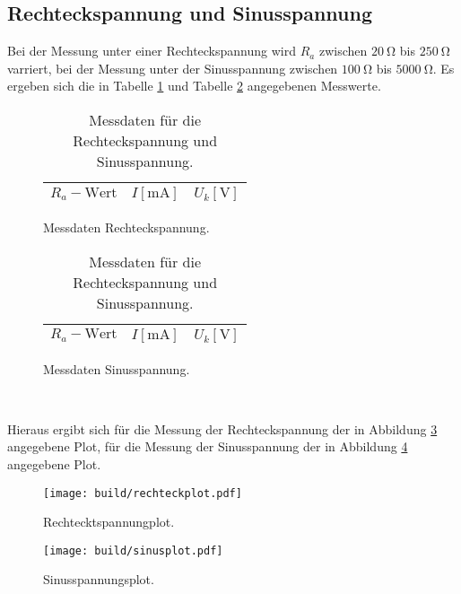 \subsection{Rechteckspannung und Sinusspannung}
Bei der Messung unter einer Rechteckspannung wird $R_a$ zwischen $\SI{20}{\ohm}$ bis $\SI{250}{\ohm}$ varriert, bei der Messung unter der Sinusspannung zwischen $\SI{100}{\ohm}$ bis $\SI{5000}{\ohm}$.
Es ergeben sich die in Tabelle \ref{tab:3} und Tabelle \ref{tab:4} angegebenen Messwerte.
\begin{table}[H]
  \hspace*{\fill}
  \begin{subfigure}{0.40\textwidth}
  \centering
  \caption{Messdaten Rechteckspannung.}
  \label{tab:3}
  \begin{tabular}{c c c}
    \toprule
    {$R_a-\text{Wert}$} & {$I [\si{\milli\ampere}]$} & {$U_k [\si{\volt}]$} \\
    \midrule
    
    \bottomrule
  \end{tabular}
\end{subfigure}
\hspace*{\fill}
\begin{subfigure}{0.40\textwidth}
  \centering
  \caption{Messdaten Sinusspannung.}
  \label{tab:4}
  \begin{tabular}{c c c}
    \toprule
    {$R_a-\text{Wert}$} & {$I [\si{\milli\ampere}]$} & {$U_k [\si{\volt}]$} \\
    \midrule
    
    \bottomrule
  \end{tabular}
\end{subfigure}
\\
\hspace*{\fill}
\hspace*{\fill}
\caption{Messdaten für die Rechteckspannung und Sinusspannung.}
\end{table}
Hieraus ergibt sich für die Messung der Rechteckspannung der in Abbildung \ref{fig:3} angegebene Plot, für die Messung der Sinusspannung der in Abbildung \ref{fig:4} angegebene Plot.
\begin{figure}[H]
  \centering
  \texttt{[image: build/rechteckplot.pdf]}
  \caption{Rechtecktspannungplot.}
  \label{fig:3}
\end{figure}
\begin{figure}[H]
  \centering
  \texttt{[image: build/sinusplot.pdf]}
  \caption{Sinusspannungsplot.}
  \label{fig:4}
\end{figure}
